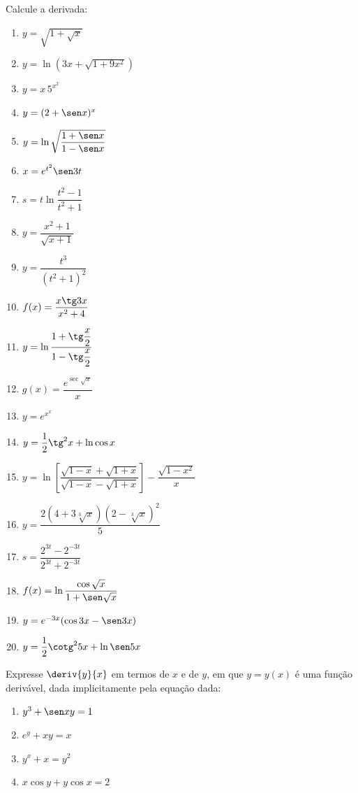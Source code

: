\begin{exercicio}[2]
Calcule a derivada:
\begin{enumerate}[label=\alph*)]
    \item $y = \sqrt{1 + \sqrt{x}}$
    \item $y = \ln(3x + \sqrt{1 + 9x^2})$
    \item $y = x\,5^{x^2}$
    \item $y = (2 + \sen x)^x$
    \item $y = \ln\sqrt{\dfrac{1 + \sen x}{1 - \sen x}}$
    \item $x = e^{t^2}\sen 3t$
    \item $s = t\ln\dfrac{t^2 - 1}{t^2 + 1}$
    \item $y = \dfrac{x^2 + 1}{\sqrt{x + 1}}$
    \item $y = \dfrac{t^3}{(t^2 + 1)^2}$
    \item $f(x) = \dfrac{x\tg 3x}{x^2 + 4}$
    \item $y = \ln\dfrac{1 + \tg\dfrac{x}{2}}{1 - \tg\dfrac{x}{2}}$
    \item $g(x) = \dfrac{e^{\sec\sqrt{x}}}{x}$
    \item $y = e^{x^x}$
    \item $y = \dfrac{1}{2}\tg^2 x + \ln\cos x$
    \item $y = \ln\!\left[\dfrac{\sqrt{1 - x} + \sqrt{1 + x}}{\sqrt{1 - x} - \sqrt{1 + x}}\right] - \dfrac{\sqrt{1 - x^2}}{x}$
    \item $y = \dfrac{2(4 + 3\sqrt[3]{x})(2 - \sqrt[3]{x})^2}{5}$
    \item $s = \dfrac{2^{3t} - 2^{-3t}}{2^{3t} + 2^{-3t}}$
    \item $f(x) = \ln\dfrac{\cos\sqrt{x}}{1 + \sen\sqrt{x}}$
    \item $y = e^{-3x}(\cos 3x - \sen 3x)$
    \item $y = \dfrac{1}{2}\cotg^2 5x + \ln\sen 5x$
\end{enumerate}
\end{exercicio}

\begin{exercicio}[3]
Expresse $\deriv{y}{x}$ em termos de $x$ e de $y$, em que $y = y(x)$ é uma função derivável, dada implicitamente pela equação dada:
\begin{enumerate}[label=\alph*)]
    \item $y^3 + \sen xy = 1$
    \item $e^y + xy = x$
    \item $y^x + x = y^2$
    \item $x\cos y + y\cos x = 2$
\end{enumerate}
\end{exercicio}

